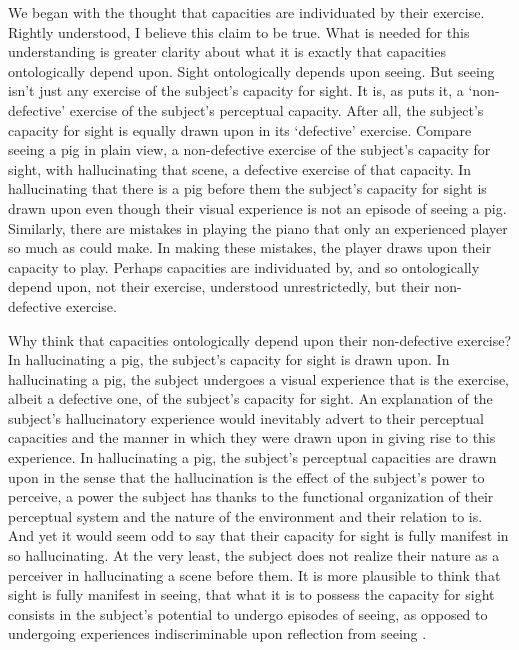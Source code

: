 \documentclass[12pt]{article}
\begin{document}
We began with the thought that capacities are individuated by their exercise. Rightly understood, I believe this claim to be true. What is needed for this understanding is greater clarity about what it is exactly that capacities ontologically depend upon. Sight ontologically depends upon seeing. But seeing isn't just any exercise of the subject's capacity for sight. It is, as \citet{McDowell:2010fk} puts it, a `non-defective' exercise of the subject's perceptual capacity. After all, the subject's capacity for sight is equally drawn upon in its `defective' exercise. Compare seeing a pig in plain view, a non-defective exercise of the subject's capacity for sight, with hallucinating that scene, a defective exercise of that capacity. In hallucinating that there is a pig before them the subject's capacity for sight is drawn upon even though their visual experience is not an episode of seeing a pig. Similarly, there are mistakes in playing the piano that only an experienced player so much as could make. In making these mistakes, the player draws upon their capacity to play. Perhaps capacities are individuated by, and so ontologically depend upon, not their exercise, understood unrestrictedly, but their non-defective exercise.

Why think that capacities ontologically depend upon their non-defective exercise? In hallucinating a pig, the subject's capacity for sight is drawn upon. In hallucinating a pig, the subject undergoes a visual experience that is the exercise, albeit a defective one, of the subject's capacity for sight. An explanation of the subject's hallucinatory experience would inevitably advert to their perceptual capacities and the manner in which they were drawn upon in giving rise to this experience. In hallucinating a pig, the subject's perceptual capacities are drawn upon in the sense that the hallucination is the effect of the subject's power to perceive, a power the subject has thanks to the functional organization of their perceptual system and the nature of the environment and their relation to is. And yet it would seem odd to say that their capacity for sight is fully manifest in so hallucinating. At the very least, the subject does not realize their nature as a perceiver in hallucinating a scene before them. It is more plausible to think that sight is fully manifest in seeing, that what it is to possess the capacity for sight consists in the subject's potential to undergo episodes of seeing, as opposed to undergoing experiences indiscriminable upon reflection from seeing \citep[compare][especially p. 72]{Martin:2004fj}.
\end{document}
